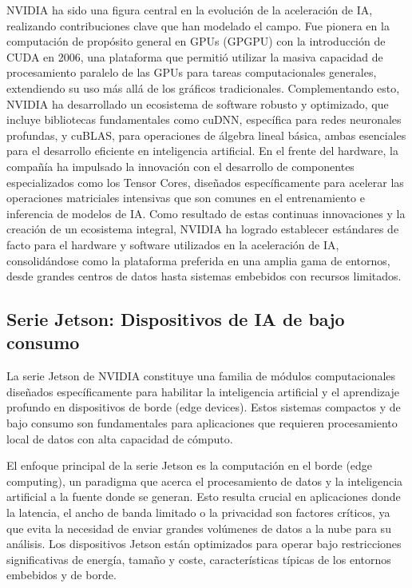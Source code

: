 \documentclass[11pt,spanish,listoffigures,listoftables]{tfgetsinf}
\begin{document}
NVIDIA ha sido una figura central en la evolución de la aceleración de IA, realizando contribuciones clave que han modelado el campo. Fue pionera en la computación de propósito general en GPUs (GPGPU) con la introducción de CUDA en 2006, una plataforma que permitió utilizar la masiva capacidad de procesamiento paralelo de las GPUs para tareas computacionales generales, extendiendo su uso más allá de los gráficos tradicionales. Complementando esto, NVIDIA ha desarrollado un ecosistema de software robusto y optimizado, que incluye bibliotecas fundamentales como cuDNN, específica para redes neuronales profundas, y cuBLAS, para operaciones de álgebra lineal básica, ambas esenciales para el desarrollo eficiente en inteligencia artificial. En el frente del hardware, la compañía ha impulsado la innovación con el desarrollo de componentes especializados como los Tensor Cores, diseñados específicamente para acelerar las operaciones matriciales intensivas que son comunes en el entrenamiento e inferencia de modelos de IA. Como resultado de estas continuas innovaciones y la creación de un ecosistema integral, NVIDIA ha logrado establecer estándares de facto para el hardware y software utilizados en la aceleración de IA, consolidándose como la plataforma preferida en una amplia gama de entornos, desde grandes centros de datos hasta sistemas embebidos con recursos limitados.


\subsection{Serie Jetson: Dispositivos de IA de bajo consumo}
La serie Jetson de NVIDIA constituye una familia de módulos computacionales diseñados específicamente para habilitar la inteligencia artificial y el aprendizaje profundo en dispositivos de borde (edge devices). Estos sistemas compactos y de bajo consumo son fundamentales para aplicaciones que requieren procesamiento local de datos con alta capacidad de cómputo.

El enfoque principal de la serie Jetson es la computación en el borde (edge computing), un paradigma que acerca el procesamiento de datos y la inteligencia artificial a la fuente donde se generan. Esto resulta crucial en aplicaciones donde la latencia, el ancho de banda limitado o la privacidad son factores críticos, ya que evita la necesidad de enviar grandes volúmenes de datos a la nube para su análisis. Los dispositivos Jetson están optimizados para operar bajo restricciones significativas de energía, tamaño y coste, características típicas de los entornos embebidos y de borde.
\end{document}
